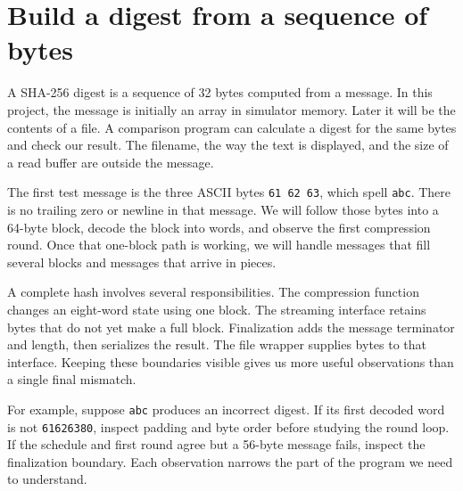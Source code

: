 \section{Build a digest from a sequence of bytes}
A SHA-256 digest is a sequence of 32 bytes computed from a message. In this project,
the message is initially an array in simulator memory. Later it will be the contents
of a file. A comparison program can calculate a digest for the same bytes and check
our result. The filename, the way the text is displayed, and the size of a read buffer
are outside the message.

The first test message is the three ASCII bytes \texttt{61 62 63}, which spell
\texttt{abc}. There is no trailing zero or newline in that message. We will follow
those bytes into a 64-byte block, decode the block into words, and observe the first
compression round. Once that one-block path is working, we will handle messages that
fill several blocks and messages that arrive in pieces.

A complete hash involves several responsibilities. The compression function changes
an eight-word state using one block. The streaming interface retains bytes that do
not yet make a full block. Finalization adds the message terminator and length, then
serializes the result. The file wrapper supplies bytes to that interface. Keeping these
boundaries visible gives us more useful observations than a single final mismatch.

For example, suppose \texttt{abc} produces an incorrect digest. If its first decoded
word is not \texttt{61626380}, inspect padding and byte order before studying the
round loop. If the schedule and first round agree but a 56-byte message fails, inspect
the finalization boundary. Each observation narrows the part of the program we need
to understand.
